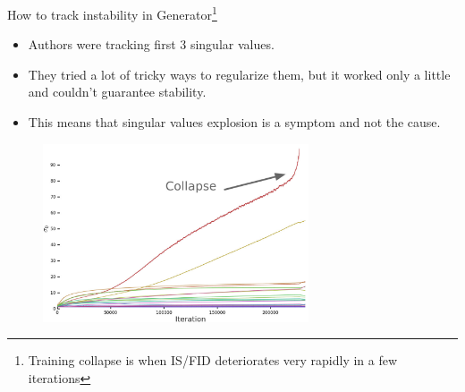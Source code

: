 \documentclass[handout, 10pt]{beamer}
\begin{document}
\begin{frame}{How to track instability in Generator\footnote{Training collapse is when IS/FID deteriorates very rapidly in a few iterations}}
    \begin{itemize}
        \item \pause Authors were tracking first 3 singular values.
        \item \pause They tried a lot of tricky ways to regularize them, but it worked only a little and couldn't guarantee stability.
        \item \pause This means that singular values explosion is a symptom and not the cause.
    \end{itemize}
    
    \begin{figure}
        \centering
        \includegraphics[width=0.7\textwidth]{images/biggan-singular-values-generator}
    \end{figure}
\end{frame}
\end{document}
